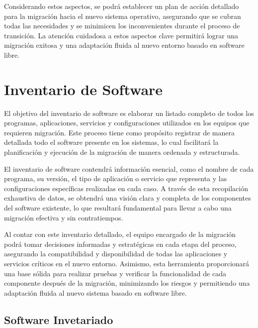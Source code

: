 		Considerando estos aspectos, se podrá establecer un plan de acción detallado para la migración hacia el nuevo sistema operativo, asegurando que se cubran todas las necesidades y se minimicen los inconvenientes durante el proceso de transición. La atención cuidadosa a estos aspectos clave permitirá lograr una migración exitosa y una adaptación fluida al nuevo entorno basado en software libre.\par
			
	
		\vspace{0.3cm}
		
	\section{Inventario de Software}
		
		El objetivo del inventario de software es elaborar un listado completo de todos los programas, aplicaciones, servicios y configuraciones utilizados en los equipos que requieren migración. Este proceso tiene como propósito registrar de manera detallada todo el software presente en los sistemas, lo cual facilitará la planificación y ejecución de la migración de manera ordenada y estructurada.\par
		
		El inventario de software contendrá información esencial, como el nombre de cada programa, su versión, el tipo de aplicación o servicio que representa y las configuraciones específicas realizadas en cada caso. A través de esta recopilación exhaustiva de datos, se obtendrá una visión clara y completa de los componentes del software existente, lo que resultará fundamental para llevar a cabo una migración efectiva y sin contratiempos.\par
		
		Al contar con este inventario detallado, el equipo encargado de la migración podrá tomar decisiones informadas y estratégicas en cada etapa del proceso, asegurando la compatibilidad y disponibilidad de todas las aplicaciones y servicios críticos en el nuevo entorno. Asimismo, esta herramienta proporcionará una base sólida para realizar pruebas y verificar la funcionalidad de cada componente después de la migración, minimizando los riesgos y permitiendo una adaptación fluida al nuevo sistema basado en software libre.\par
		
		\vspace{0.3cm}
		
		\subsection{Software Invetariado}
			
